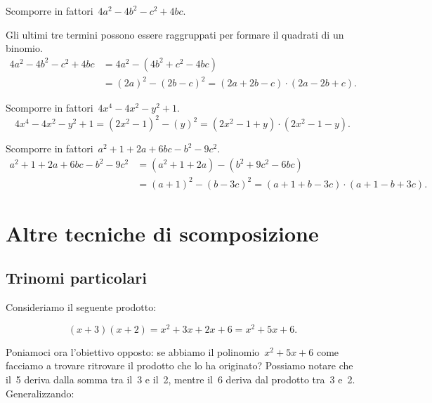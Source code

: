 \begin{exrig}
 \begin{esempio}
Scomporre in fattori~$4a^{2}-4b^{2}-c^{2}+4bc$.

Gli ultimi tre termini possono essere raggruppati per formare il quadrati di un binomio.
 \begin{equation*}
   \begin{split}
     4a^{2}-4b^{2}-c^{2}+4bc &=4a^{2}-\left(4b^{2}+c^{2}-4bc\right) \\
                 &= (2a)^{2}-(2b-c)^{2}=(2a+2b-c)\cdot (2a-2b+c).
   \end{split}
  \end{equation*}
 \end{esempio}

 \begin{esempio}
Scomporre in fattori~$4x^{4}-4x^{2}-y^{2}+1$.
\[4x^{4}-4x^{2}-y^{2}+1=\left(2x^{2}-1\right)^{2}-(y)^{2}=(2x^{2}-1+y)\cdot (2x^{2}-1-y).\]
 \end{esempio}

 \begin{esempio}
Scomporre in fattori~$a^{2}+1+2a+6bc-b^{2}-9c^{2}$.
 \begin{equation*}
   \begin{split}
     a^{2}+1+2a+6bc-b^{2}-9c^{2} &=\left(a^{2}+1+2a\right)-\left(b^{2}+9c^{2}-6{bc}\right) \\
                 &= (a+1)^{2}-(b-3c)^{2}=(a+1+b-3c)\cdot (a+1-b+3c).
   \end{split}
  \end{equation*}
 \end{esempio}
\end{exrig}
\ovalbox{\risolvii  \ref{ese:13.47}, \ref{ese:13.48}, \ref{ese:13.49}, \ref{ese:13.50}, \ref{ese:13.51}, \ref{ese:13.52}, \ref{ese:13.53}, \ref{ese:13.54}, \ref{ese:13.55}, \ref{ese:13.56}}

\section{Altre tecniche di scomposizione}

\subsection{Trinomi particolari}

Consideriamo il seguente prodotto:

\[(x+3)(x+2)=x^{2}+3x+2x+6=x^{2}+5x+6.\]

Poniamoci ora l'obiettivo opposto: se abbiamo il
polinomio~$x^{2}+5x+6$ come facciamo a trovare ritrovare il prodotto
che lo ha originato? Possiamo notare che il~5 deriva dalla somma tra
il~3 e il~2, mentre il~6 deriva dal prodotto tra~3 e~2. Generalizzando:

